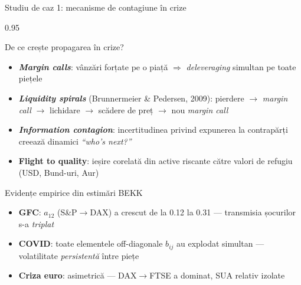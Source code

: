 \documentclass[9pt, aspectratio=169, t]{beamer}
\begin{document}
\begin{frame}{Studiu de caz 1: mecanisme de contagiune în crize}
    \begin{cminipage}{0.95\textwidth}
    {\footnotesize
    \begin{block}{De ce crește propagarea în crize?}
        \begin{itemize}\setlength{\itemsep}{1pt}
            \item \textbf{\textit{Margin calls}}: vânzări forțate pe o piață $\Rightarrow$ \textit{deleveraging} simultan pe toate piețele
            \item \textbf{\textit{Liquidity spirals}} (Brunnermeier \& Pedersen, 2009): pierdere $\rightarrow$ \textit{margin call} $\rightarrow$ lichidare $\rightarrow$ scădere de preț $\rightarrow$ nou \textit{margin call}
            \item \textbf{\textit{Information contagion}}: incertitudinea privind expunerea la contrapărți creează dinamici \textit{``who's next?''}
            \item \textbf{Flight to quality}: ieșire corelată din active riscante către valori de refugiu (USD, Bund-uri, Aur)
        \end{itemize}
    \end{block}
    \begin{alertblock}{Evidențe empirice din estimări BEKK}
        \begin{itemize}\setlength{\itemsep}{0pt}
            \item \textbf{GFC}: $a_{12}$ (S\&P$\rightarrow$DAX) a crescut de la 0.12 la 0.31 --- transmisia șocurilor s-a \textit{triplat}
            \item \textbf{COVID}: toate elementele off-diagonale $b_{ij}$ au explodat simultan --- volatilitate \textit{persistentă} între piețe
            \item \textbf{Criza euro}: asimetrică --- DAX$\rightarrow$FTSE a dominat, SUA relativ izolate
        \end{itemize}
    \end{alertblock}
    }
    \end{cminipage}
\end{frame}
\end{document}
